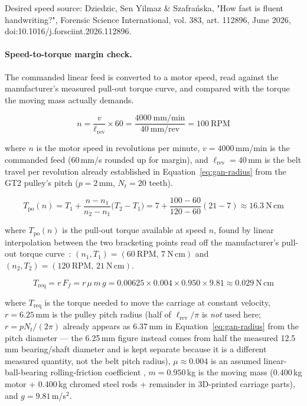 Desired speed source: Dziedzic, Sen Yilmaz & Szafrańska, "How fast is fluent handwriting?", Forensic Science International, vol. 383, art. 112896, June 2026, doi:10.1016/j.forsciint.2026.112896.
\paragraph{Speed-to-torque margin check.}
The commanded linear feed is converted to a motor speed, read against the manufacturer's measured pull-out torque curve, and compared with the torque the moving mass actually demands.

\begin{equation}
n = \frac{v}{\ell_{\mathrm{rev}}}\times 60 = \frac{4000\ \mathrm{mm/min}}{40\ \mathrm{mm/rev}} = 100\ \mathrm{RPM}
\label{eq:gan-rpm}
\end{equation}

where $n$ is the motor speed in revolutions per minute, $v=4000$\,mm/min is the commanded feed (60\,mm/s rounded up for margin), and $\ell_{\mathrm{rev}}=40$\,mm is the belt travel per revolution already established in Equation~\ref{eq:gan-radius} from the GT2 pulley's pitch ($p=2$\,mm, $N_t=20$ teeth).

\begin{equation}
T_{\mathrm{po}}(n) = T_1 + \frac{n-n_1}{n_2-n_1}\bigl(T_2-T_1\bigr) = 7 + \frac{100-60}{120-60}(21-7) \approx 16.3\ \mathrm{N\,cm}
\label{eq:gan-pullout}
\end{equation}

where $T_{\mathrm{po}}(n)$ is the pull-out torque available at speed $n$, found by linear interpolation between the two bracketing points read off the manufacturer's pull-out torque curve~\cite{stepperds}: $(n_1,T_1)=(60\ \mathrm{RPM},\,7\ \mathrm{N\,cm})$ and $(n_2,T_2)=(120\ \mathrm{RPM},\,21\ \mathrm{N\,cm})$. 

\begin{equation}
T_{\mathrm{req}} = r\,F_f = r\,\mu\,m\,g = 0.00625 \times 0.004 \times 0.950 \times 9.81 \approx 0.029\ \mathrm{N\,cm}
\label{eq:gan-treq}
\end{equation}

where $T_{\mathrm{req}}$ is the torque needed to move the carriage at constant velocity, $r=6.25$\,mm is the pulley pitch radius (half of $\ell_{\mathrm{rev}}/\pi$ is \emph{not} used here; $r=p N_t/(2\pi)$ already appears as 6.37\,mm in Equation~\ref{eq:gan-radius} from the pitch diameter --- the 6.25\,mm figure instead comes from half the measured 12.5\,mm bearing/shaft diameter and is kept separate because it is a different measured quantity, not the belt pitch radius), $\mu\approx0.004$ is an assumed linear-ball-bearing rolling-friction coefficient , $m=0.950$\,kg is the moving mass (0.400\,kg motor + 0.400\,kg chromed steel rods + remainder in 3D-printed carriage parts), and $g=9.81$\,m/s$^2$.

